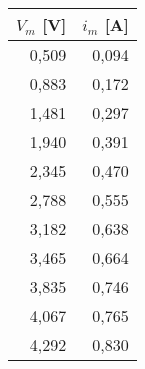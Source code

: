 \begin{tabular}{r|r}
$V_m$ [V]&$i_m$ [A]\\\hline
0,509&0,094 \\ %
0,883&0,172 \\ %
1,481&0,297 \\ %
1,940&0,391 \\ %
2,345&0,470 \\ %
2,788&0,555 \\ %
3,182&0,638 \\ %
3,465&0,664 \\ %
3,835&0,746 \\ %
4,067&0,765 \\ %
4,292&0,830 \\ %
\end{tabular}
